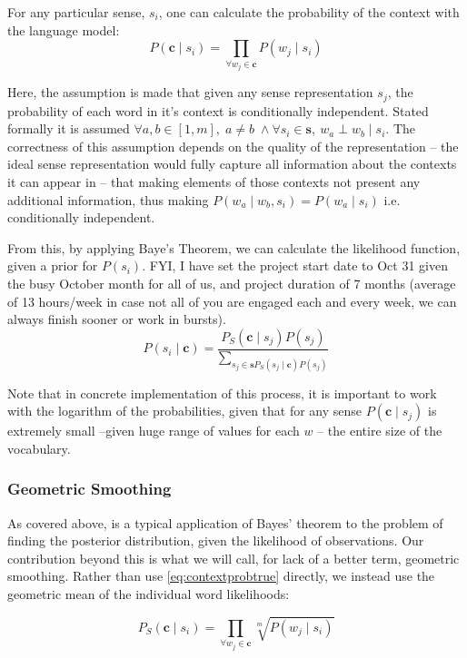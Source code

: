 \documentclass{sig-alternate}
\renewcommand{\c}{\mathbf{c}}
\newcommand{\s}{\mathbf{s}}
\begin{document}
For any particular sense, $s_i$, one can calculate the probability of the context with the language model:
\begin{equation} \label{eq:contextprobtrue} P(\c \mid s_{i})=\prod_{\forall w_{j}\in\c}P(w_{j} \mid s_{i})
\end{equation}

Here, the assumption is made that given any sense representation $s_j$, the probability of each word in it's context is conditionally independent. Stated formally it is assumed $\forall a,b \in [1,m],\; a \ne b\; \wedge \forall s_i \in \s,\:w_a \perp w_b \mid s_i$.
The correctness of this assumption depends on the quality of the representation -- the ideal sense representation would fully capture all information about the contexts it can appear in -- that making elements of those contexts not present any additional information, thus making $P(w_a \mid w_b,s_i)=P(w_a \mid s_i)$ i.e. conditionally independent.


From this, by applying Baye's Theorem, we can calculate the likelihood function, given a prior for $P(s_i)$.
FYI, I have set the project start date to Oct 31 given the busy October month for all of us, and project duration of 7 months (average of 13 hours/week in case not all of you are engaged each and every week, we can always finish sooner or work in bursts). 
\begin{equation} \label{eq:generalwsd}
P(s_{i} \mid \c) = \dfrac{P_S(\c \mid s_{j})P(s_{j})}{\sum_{s_{j}\in\s P_S(s_{j} \mid \c)P(s_{j})}}
\end{equation}

Note that in concrete implementation of this process, it is important to work with the logarithm of the probabilities, given that for any sense $P(\c \mid s_j)$ is extremely small --given huge range of values for each $w$ -- the entire size of the vocabulary.

\subsubsection{Geometric Smoothing}
As covered above, is a typical application of Bayes' theorem to the problem of finding the posterior distribution, given the likelihood of observations.
Our contribution beyond this is what we will call, for lack of a better term, geometric smoothing.
Rather than use \cref{eq:contextprobtrue} directly, we instead use the geometric mean of the individual word likelihoods:

\begin{equation} \label{eq:contrextprobsmooth}
P_S(\c \mid s_{i})=\prod_{\forall w_{j}\in\c}\sqrt[m]{P(w_{j} \mid s_{i})}
\end{equation}
\end{document}
